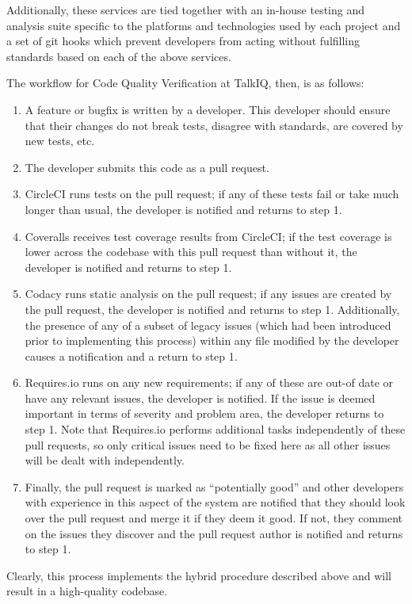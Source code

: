 \documentclass[12pt]{article}
\begin{document}
Additionally, these services are tied together with an in-house testing and analysis suite specific to the platforms and technologies used by each project and a set of git hooks which prevent developers from acting without fulfilling standards based on each of the above services.

The workflow for Code Quality Verification at TalkIQ, then, is as follows:
\begin{enumerate}
\item A feature or bugfix is written by a developer. This developer should ensure that their changes do not break tests, disagree with standards, are covered by new tests, etc.
\item The developer submits this code as a pull request.
\item CircleCI runs tests on the pull request; if any of these tests fail or take much longer than usual, the developer is notified and returns to step 1.
\item Coveralls receives test coverage results from CircleCI; if the test coverage is lower across the codebase with this pull request than without it, the developer is notified and returns to step 1.
\item Codacy runs static analysis on the pull request; if any issues are created by the pull request, the developer is notified and returns to step 1. Additionally, the presence of any of a subset of legacy issues (which had been introduced prior to implementing this process) within any file modified by the developer causes a notification and a return to step 1.
\item Requires.io runs on any new requirements; if any of these are out-of date or have any relevant issues, the developer is notified. If the issue is deemed important in terms of severity and problem area, the developer returns to step 1. Note that Requires.io performs additional tasks independently of these pull requests, so only critical issues need to be fixed here as all other issues will be dealt with independently.
\item Finally, the pull request is marked as ``potentially good'' and other developers with experience in this aspect of the system are notified that they should look over the pull request and merge it if they deem it good. If not, they comment on the issues they discover and the pull request author is notified and returns to step 1.
\end{enumerate}

Clearly, this process implements the hybrid procedure described above and will result in a high-quality codebase.
\end{document}
